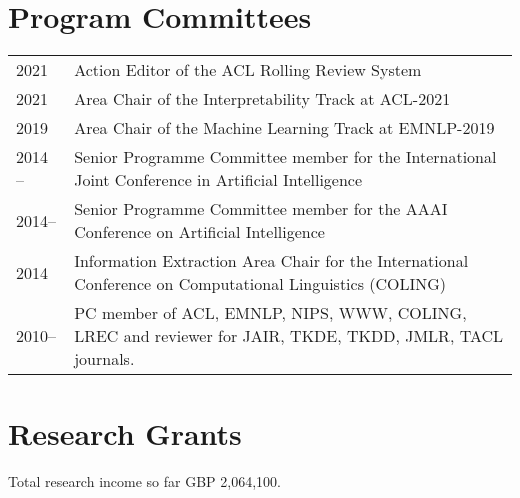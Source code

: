 \documentclass[a4paper,11pt]{article}
\begin{document}
\section{Program Committees}
\begin{tabular}{l p{13cm}}
2021 & Action Editor of the ACL Rolling Review System \\
2021 & Area Chair of the Interpretability Track at ACL-2021\\
2019 & Area Chair of the Machine Learning Track at EMNLP-2019\\
2014 -- & Senior Programme Committee member for the International Joint Conference in Artificial Intelligence\\
2014-- & Senior Programme Committee member for the AAAI Conference on Artificial Intelligence\\
2014 & Information Extraction Area Chair for the International Conference on Computational Linguistics (COLING)\\
2010-- & PC member of ACL, EMNLP, NIPS, WWW, COLING, LREC and reviewer for JAIR, TKDE, TKDD, JMLR, TACL journals.
\end{tabular}



\section{Research Grants}

Total research income so far GBP 2,064,100.
\end{document}
